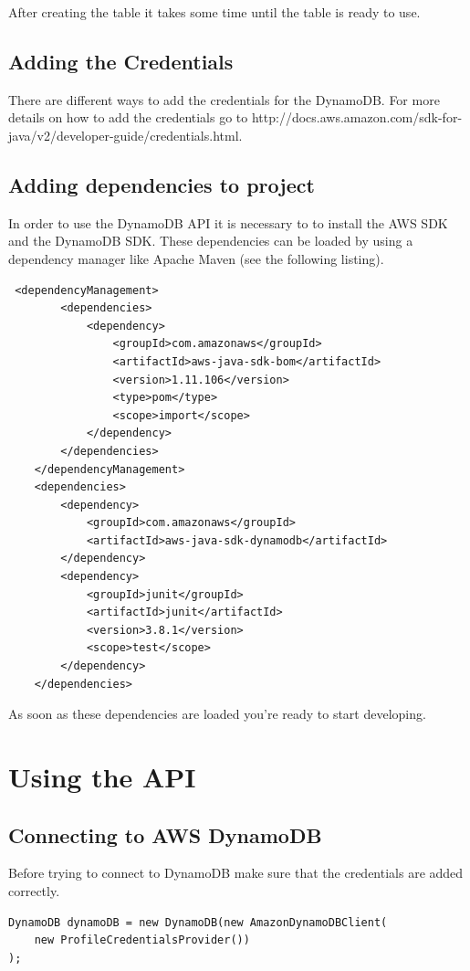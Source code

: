 After creating the table it takes some time until the table is ready to use.

\subsection{Adding the Credentials}
There are different ways to add the credentials for the DynamoDB. For more details on how to add the credentials go to http://docs.aws.amazon.com/sdk-for-java/v2/developer-guide/credentials.html. 

\subsection{Adding dependencies to project}
In order to use the DynamoDB API it is necessary to to install the AWS SDK and the DynamoDB SDK. These dependencies can be loaded by using a dependency manager like Apache Maven (see the following listing). 

\begin{lstlisting}
 <dependencyManagement>
        <dependencies>
            <dependency>
                <groupId>com.amazonaws</groupId>
                <artifactId>aws-java-sdk-bom</artifactId>
                <version>1.11.106</version>
                <type>pom</type>
                <scope>import</scope>
            </dependency>
        </dependencies>
    </dependencyManagement>
    <dependencies>
        <dependency>
            <groupId>com.amazonaws</groupId>
            <artifactId>aws-java-sdk-dynamodb</artifactId>
        </dependency>
        <dependency>
            <groupId>junit</groupId>
            <artifactId>junit</artifactId>
            <version>3.8.1</version>
            <scope>test</scope>
        </dependency>
    </dependencies>
\end{lstlisting}

As soon as these dependencies are loaded you're ready to start developing.

\section{Using the API}
\subsection{Connecting to AWS DynamoDB}
Before trying to connect to DynamoDB make sure that the credentials are added correctly. 

\begin{lstlisting}
DynamoDB dynamoDB = new DynamoDB(new AmazonDynamoDBClient(
	new ProfileCredentialsProvider())
);
\end{lstlisting}

